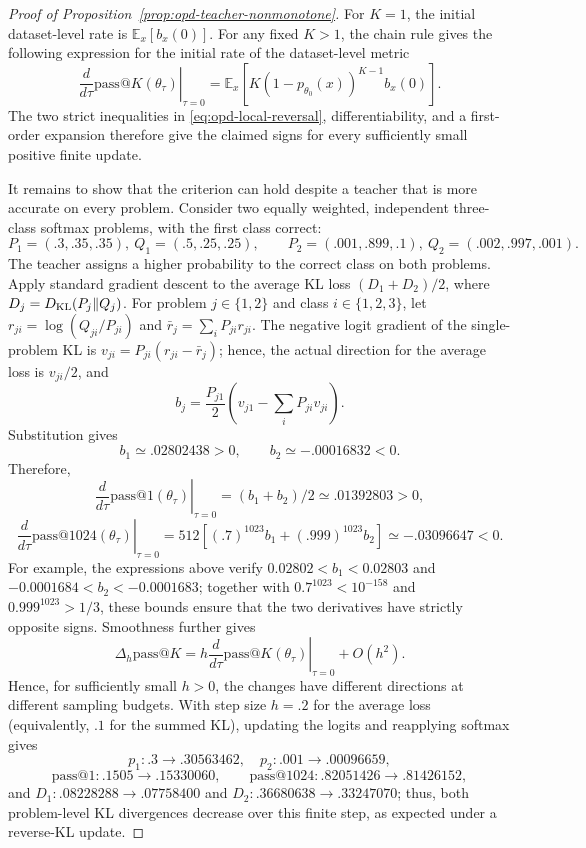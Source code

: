 \documentclass{article}
\theoremstyle{opdplain}
\begin{document}
\begin{proof}[Proof of Proposition~\ref{prop:opd-teacher-nonmonotone}]
For $K=1$, the initial dataset-level rate is $\mathbb E_x[b_x(0)]$. For any fixed $K>1$, the chain rule gives the following expression for the initial rate of the dataset-level metric
\[
 \left.\frac{d}{d\tau}\mathrm{pass}@K(\theta_\tau)\right|_{\tau=0}
 =\mathbb E_x\!\left[K(1-p_{\theta_0}(x))^{K-1}b_x(0)\right].
\]
The two strict inequalities in \eqref{eq:opd-local-reversal}, differentiability, and a first-order expansion therefore give the claimed signs for every sufficiently small positive finite update.

It remains to show that the criterion can hold despite a teacher that is more accurate on every problem. Consider two equally weighted, independent three-class softmax problems, with the first class correct:
\[
 P_1=(.3,.35,.35),\ Q_1=(.5,.25,.25),\qquad
 P_2=(.001,.899,.1),\ Q_2=(.002,.997,.001).
\]
The teacher assigns a higher probability to the correct class on both problems. Apply standard gradient descent to the average KL loss $(D_1+D_2)/2$, where $D_j=D_{\rm KL}(P_j\|Q_j)$. For problem $j\in\{1,2\}$ and class $i\in\{1,2,3\}$, let $r_{ji}=\log(Q_{ji}/P_{ji})$ and $\bar r_j=\sum_iP_{ji}r_{ji}$. The negative logit gradient of the single-problem KL is $v_{ji}=P_{ji}(r_{ji}-\bar r_j)$; hence, the actual direction for the average loss is $v_{ji}/2$, and
\[
 b_j=\frac{P_{j1}}{2}\left(v_{j1}-\sum_iP_{ji}v_{ji}\right).
\]
Substitution gives
\[
 b_1\simeq .02802438>0,\qquad
 b_2\simeq-.00016832<0.
\]
Therefore,
\[
 \left.\frac{d}{d\tau}\mathrm{pass}@1(\theta_\tau)\right|_{\tau=0}
 =(b_1+b_2)/2\simeq .01392803>0,
\]
\[
 \left.\frac{d}{d\tau}\mathrm{pass}@1024(\theta_\tau)\right|_{\tau=0}
 =512[(.7)^{1023}b_1+(.999)^{1023}b_2]
 \simeq-.03096647<0.
\]
For example, the expressions above verify $0.02802<b_1<0.02803$ and $-0.0001684<b_2<-0.0001683$; together with $0.7^{1023}<10^{-158}$ and $0.999^{1023}>1/3$, these bounds ensure that the two derivatives have strictly opposite signs. Smoothness further gives
\[
 \Delta_h\mathrm{pass}@K
 =h\left.\frac{d}{d\tau}\mathrm{pass}@K(\theta_\tau)\right|_{\tau=0}+O(h^2).
\]
Hence, for sufficiently small $h>0$, the changes have different directions at different sampling budgets. With step size $h=.2$ for the average loss (equivalently, $.1$ for the summed KL), updating the logits and reapplying softmax gives
\[
 p_1:.3\to.30563462,\quad p_2:.001\to.00096659,
\]
\[
 \mathrm{pass}@1:.1505\to.15330060,\qquad
 \mathrm{pass}@1024:.82051426\to.81426152,
\]
and $D_1:.08228288\to.07758400$ and $D_2:.36680638\to.33247070$; thus, both problem-level KL divergences decrease over this finite step, as expected under a reverse-KL update.


\end{proof}
\end{document}
